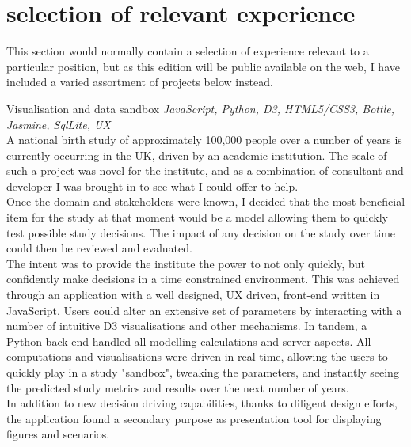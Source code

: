 \documentclass[]{friggeri-cv} %
\begin{document}

\newpage
\section{selection of relevant experience}
This section would normally contain a selection of experience relevant to a particular position, but as this edition will be public available on the web, I have included a varied assortment of projects below instead. 

\begin{projectentrylist}
\projectentry
{Visualisation and data sandbox}
{\emph{JavaScript, Python, D3, HTML5/CSS3, Bottle, Jasmine, SqlLite, UX} \\
A national birth study of approximately 100,000 people over a number of years is currently occurring in the UK, driven by an academic institution. The scale of such a project was novel for the institute, and as a combination of consultant and developer I was brought in to see what I could offer to help.\\
Once the domain and stakeholders were known, I decided that the most beneficial item for the study at that moment would be a model allowing them to quickly test possible study decisions. The impact of any decision on the study over time could then be reviewed and evaluated.  \\
The intent was to provide the institute the power to not only quickly, but confidently make decisions in a time constrained environment. This was achieved through an application with a well designed, UX driven, front-end written in JavaScript. Users could  alter an extensive set of parameters by interacting with a number of intuitive D3 visualisations and other mechanisms. In tandem, a Python back-end handled all modelling calculations and server aspects. All computations and visualisations were driven in real-time, allowing the users to quickly play in a study "sandbox", tweaking the parameters, and instantly seeing the predicted study metrics and results over the next number of years. \\
In addition to new decision driving capabilities,  thanks to diligent design efforts, the application found a secondary purpose as presentation tool for displaying figures and scenarios.}


\end{projectentrylist}
\end{document}
